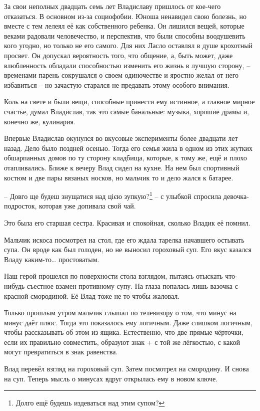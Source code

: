 \documentclass[
  a5paperpaper,
  DIV=11,
  numbers=noendperiod]{scrreprt}
\begin{document}
За свои неполных двадцать семь лет Владиславу пришлось от кое-чего
отказаться. В основном из-за социофобии. Юноша ненавидел свою болезнь,
но вместе с тем лелеял её как собственного ребенка. Он лишился вещей,
которые веками радовали человечество, и перспектив, что были способны
воодушевить кого угодно, но только не его самого. Для них Ласло оставлял
в душе крохотный просвет. Он допускал вероятность того, что общение, а,
быть может, даже влюбленность обладали способностью изменить его жизнь в
лучшую сторону, -- временами парень сокрушался о своем одиночестве и
яростно желал от него избавиться -- но зачастую старался не предавать
этому особого внимания.

Коль на свете и были вещи, способные принести ему истинное, а главное
мирное счастье, думал Владислав, так это самые банальные: музыка,
хорошие драмы и, конечно же, кулинария.

Впервые Владислав окунулся во вкусовые эксперименты более двадцати лет
назад. Дело было поздней осенью. Тогда его семья жила в одном из этих
жутких обшарпанных домов по ту сторону кладбища, которые, к тому же, ещё
и плохо отапливались. Ближе к вечеру Влад сидел на кухне. На нем был
спортивный костюм и две пары вязаных носков, но мальчик то и дело жался
к батарее.

-- Довго ще будеш знущатися над цією зупкую?\footnote{Долго ещё будешь
  издеваться над этим супом?} -- с улыбкой спросила девочка-подросток,
которая уже допивала свой чай.

Это была его старшая сестра. Красивая и спокойная, сколько Владик её
помнил.

Мальчик искоса посмотрел на стол, где его ждала тарелка начавшего
остывать супа. Он вроде как был голоден, но не выносил гороховый суп.
Его вкус казался Владу каким-то\ldots{} простоватым.

Наш герой прошелся по поверхности стола взглядом, пытаясь отыскать
что-нибудь съестное взамен противному супу. На глаза попалась лишь
вазочка с красной смородиной. Её Влад тоже не то чтобы жаловал.

Только прошлым утром мальчик слышал по телевизору о том, что минус на
минус даёт плюс. Тогда это показалось ему логичным. Даже слишком
логичным, чтобы рассказывать об этом из ящика. Естественно, что две
прямые чёрточки, если их правильно совместить, образуют знак + с той же
лёгкостью, с какой могут превратиться в знак равенства.

Влад перевёл взгляд на гороховый суп. Затем посмотрел на смородину. И
снова на суп. Теперь мысль о минусах вдруг открылась ему в новом ключе.
\end{document}
